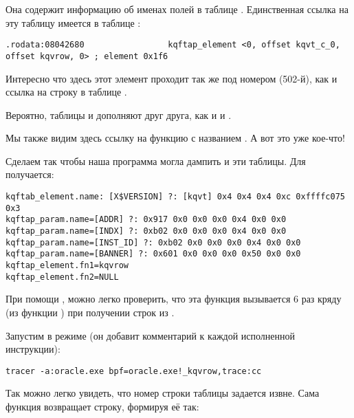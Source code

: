 

Она содержит информацию об именах полей в таблице .
Единственная ссылка на эту таблицу имеется в таблице :

\begin{lstlisting}[caption=kqf.o]
.rodata:08042680                 kqftap_element <0, offset kqvt_c_0, offset kqvrow, 0> ; element 0x1f6
\end{lstlisting}

Интересно что здесь этот элемент проходит так же под номером  (502-й), как и ссылка на строку 
 в таблице .

Вероятно, таблицы  и  дополняют друг друга, как и  и .

Мы также видим здесь ссылку на функцию с названием . А вот это уже кое-что!

Сделаем так чтобы наша программа \oracletables могла дампить и эти таблицы. Для  получается:

\begin{lstlisting}[caption=Результат работы \OracleTablesName]
kqftab_element.name: [X$VERSION] ?: [kqvt] 0x4 0x4 0x4 0xc 0xffffc075 0x3
kqftap_param.name=[ADDR] ?: 0x917 0x0 0x0 0x0 0x4 0x0 0x0
kqftap_param.name=[INDX] ?: 0xb02 0x0 0x0 0x0 0x4 0x0 0x0
kqftap_param.name=[INST_ID] ?: 0xb02 0x0 0x0 0x0 0x4 0x0 0x0
kqftap_param.name=[BANNER] ?: 0x601 0x0 0x0 0x0 0x50 0x0 0x0
kqftap_element.fn1=kqvrow
kqftap_element.fn2=NULL
\end{lstlisting}

При помощи \tracer, можно легко проверить, что эта функция вызывается 6 раз кряду (из функции ) при получении строк из .

Запустим \tracer в режиме  (он добавит комментарий к каждой исполненной инструкции):

\begin{lstlisting}
tracer -a:oracle.exe bpf=oracle.exe!_kqvrow,trace:cc
\end{lstlisting}



Так можно легко увидеть, что номер строки таблицы задается извне. Сама функция возвращает строку, формируя её так:

